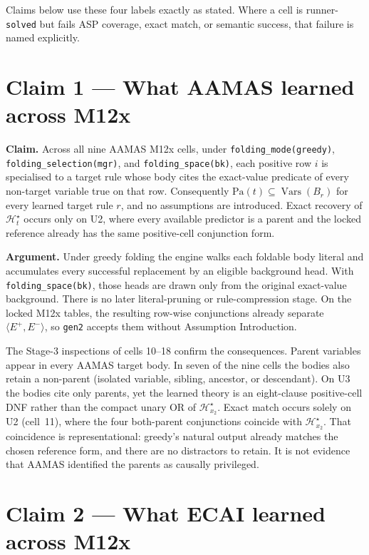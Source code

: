 \documentclass[11pt]{article}
\begin{document}
Claims below use these four labels exactly as stated. Where a cell is runner-\texttt{solved} but fails ASP coverage, exact match, or semantic success, that failure is named explicitly.

\section{Claim 1 --- What AAMAS learned across M12x}

\textbf{Claim.} Across all nine AAMAS M12x cells, under \texttt{folding\_mode(greedy)}, \texttt{folding\_selection(mgr)}, and \texttt{folding\_space(bk)}, each positive row \(i\) is specialised to a target rule whose body cites the exact-value predicate of every non-target variable true on that row. Consequently \(\mathrm{Pa}(t)\subseteq\operatorname{Vars}(B_r)\) for every learned target rule \(r\), and no assumptions are introduced. Exact recovery of \(\mathcal{H}_t^\star\) occurs only on U2, where every available predictor is a parent and the locked reference already has the same positive-cell conjunction form.

\textbf{Argument.} Under greedy folding the engine walks each foldable body literal and accumulates every successful replacement by an eligible background head. With \texttt{folding\_space(bk)}, those heads are drawn only from the original exact-value background. There is no later literal-pruning or rule-compression stage. On the locked M12x tables, the resulting row-wise conjunctions already separate \(\langle E^+,E^-\rangle\), so \texttt{gen2} accepts them without Assumption Introduction.

The Stage-3 inspections of cells 10--18 confirm the consequences. Parent variables appear in every AAMAS target body. In seven of the nine cells the bodies also retain a non-parent (isolated variable, sibling, ancestor, or descendant). On U3 the bodies cite only parents, yet the learned theory is an eight-clause positive-cell DNF rather than the compact unary OR of \(\mathcal{H}_{x_2}^\star\). Exact match occurs solely on U2 (cell~11), where the four both-parent conjunctions coincide with \(\mathcal{H}_{x_2}^\star\). That coincidence is representational: greedy's natural output already matches the chosen reference form, and there are no distractors to retain. It is not evidence that AAMAS identified the parents as causally privileged.

\section{Claim 2 --- What ECAI learned across M12x}
\end{document}
